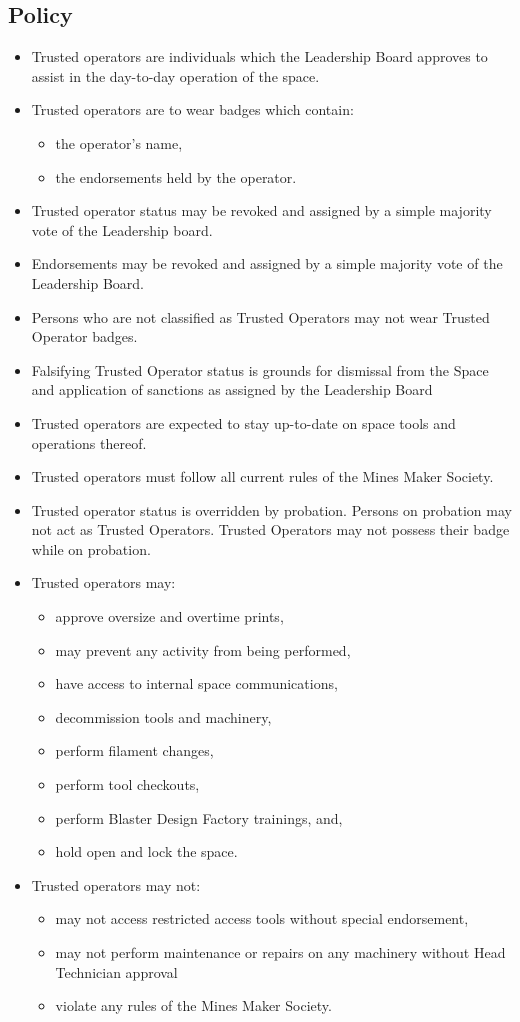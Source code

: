 \documentclass[12pt,letterpaper]{article}
\begin{document}
\subsection{Policy}
\begin{itemize}
   \item Trusted operators are individuals which the Leadership Board approves to assist in the day-to-day operation of the space.
   \item Trusted operators are to wear badges which contain:
   \begin{itemize}
    \item the operator's name,
    \item the endorsements held by the operator.
   \end{itemize}
   \item Trusted operator status may be revoked and assigned by a simple majority vote of the Leadership board.
   \item Endorsements may be revoked and assigned by a simple majority vote of the Leadership Board.
   \item Persons who are not classified as Trusted Operators may not wear Trusted Operator badges.
   \item Falsifying Trusted Operator status is grounds for dismissal from the Space and application of sanctions as assigned by the Leadership Board
   \item Trusted operators are expected to stay up-to-date on space tools and operations thereof.
   \item Trusted operators must follow all current rules of the Mines Maker Society.
   \item Trusted operator status is overridden by probation. 
   Persons on probation may not act as Trusted Operators.
   Trusted Operators may not possess their badge while on probation.
   \item Trusted operators may:
   \begin{itemize}
    \item approve oversize and overtime prints,
    \item may prevent any activity from being performed,
    \item have access to internal space communications,
    \item decommission tools and machinery,
    \item perform filament changes,
    \item perform tool checkouts,
    \item perform Blaster Design Factory trainings, and,
    \item hold open and lock the space.
   \end{itemize}
   \item Trusted operators may not:
   \begin{itemize}
    \item may not access restricted access tools without special endorsement,
    \item may not perform maintenance or repairs on any machinery without Head Technician approval 
    \item violate any rules of the Mines Maker Society.
   \end{itemize}
\end{itemize}
\end{document}
